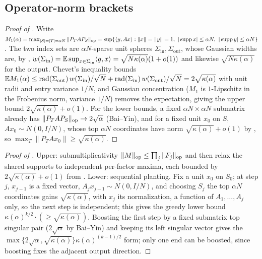 \subsection{Operator-norm brackets}
\begin{proof}[Proof of ]
Write $M_1(\alpha)=\max_{|S|=|T|=\alpha N}\|P_TAP_S\|_{\mathrm{op}}=\sup\{\langle y,Ax\rangle:\|x\|=\|y\|=1,\ |\operatorname{supp} x|\le\alpha N,\ |\operatorname{supp} y|\le\alpha N\}$.
The two index sets are $\alpha N$-sparse unit spheres $\Sigma_{\mathrm{in}},\Sigma_{\mathrm{out}}$, whose
Gaussian widths are, by , $w(\Sigma_{\mathrm{in}})=\mathbb{E}\sup_{x\in\Sigma_{\mathrm{in}}}\langle g,x\rangle=\sqrt{N\kappa(\alpha)}(1+o(1))$
and likewise $\sqrt{N\kappa(\alpha)}$ for the output. Chevet's inequality bounds
$\mathbb{E} M_1(\alpha)\le\mathrm{rad}(\Sigma_{\mathrm{out}})\,w(\Sigma_{\mathrm{in}})/\sqrt N+\mathrm{rad}(\Sigma_{\mathrm{in}})\,w(\Sigma_{\mathrm{out}})/\sqrt N=2\sqrt{\kappa(\alpha)}$
with unit radii and entry variance $1/N$, and Gaussian concentration ($M_1$ is $1$-Lipschitz in the
Frobenius norm, variance $1/N$) removes the expectation, giving the upper bound $2\sqrt{\kappa(\alpha)}+o(1)$.
For the lower bounds, a fixed $\alpha N\times\alpha N$ submatrix already has $\|P_TAP_S\|_{\mathrm{op}}\to2\sqrt\alpha$
(Bai--Yin), and for a fixed unit $x_0$ on $S$, $Ax_0\sim N(0,I/N)$, whose top $\alpha N$ coordinates have
norm $\sqrt{\kappa(\alpha)}+o(1)$ by , so $\max_T\|P_TAx_0\|\ge\sqrt{\kappa(\alpha)}$.
\end{proof}

\begin{proof}[Proof of ]
Upper: submultiplicativity $\|M\|_{\mathrm{op}}\le\prod_j\|F_j\|_{\mathrm{op}}$ and then relax the shared supports to
independent per-factor maxima, each bounded by $2\sqrt{\kappa(\alpha)}+o(1)$ from . Lower:
sequential planting. Fix a unit $x_0$ on $S_0$; at step $j$, $x_{j-1}$ is a fixed vector,
$A_jx_{j-1}\sim N(0,I/N)$, and choosing $S_j$ the top $\alpha N$ coordinates gains
$\sqrt{\kappa(\alpha)}$, with $x_j$ its normalization, a function of $A_1,\dots,A_j$ only, so the next
step is independent; this gives the greedy lower bound $\kappa(\alpha)^{k/2}\cdot(\ge\sqrt{\kappa(\alpha)})$.
Boosting the first step by a fixed submatrix top singular pair ($2\sqrt\alpha$ by Bai--Yin) and keeping
its left singular vector gives the $\max\{2\sqrt\alpha,\sqrt{\kappa(\alpha)}\}\kappa(\alpha)^{(k-1)/2}$
form; only one end can be boosted, since boosting fixes the adjacent output direction.
\end{proof}


